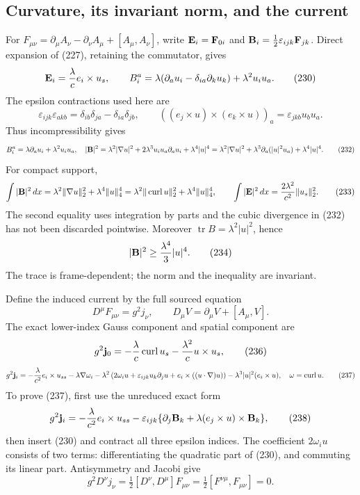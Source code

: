 \subsection{Curvature, its invariant norm, and the current}

For \(F_{\mu\nu}=\partial_\mu A_\nu-\partial_\nu A_\mu+[A_\mu,A_\nu]\),
write \({\bf E}_i={\bf F}_{0i}\) and
\({\bf B}_i=\frac12\varepsilon_{ijk}{\bf F}_{jk}\). Direct expansion of
(227), retaining the commutator, gives
\[
 {\bf E}_i=\frac{\lambda}{c}e_i\times u_s,\qquad
 B_i^a=\lambda(\partial_a u_i-\delta_{ia}\partial_k u_k)
               +\lambda^2u_i u_a.
\tag{230}
\]
The epsilon contractions used here are
\[
 \varepsilon_{ijk}\varepsilon_{akb}
 =\delta_{ib}\delta_{ja}-\delta_{ia}\delta_{jb},\qquad
 ((e_j\times u)\times(e_k\times u))_a
 =\varepsilon_{jkb}u_bu_a.
\tag{231}
\]
Thus incompressibility gives
\[
 B_i^a=\lambda\partial_a u_i+\lambda^2u_i u_a,\quad
 |{\bf B}|^2=\lambda^2|\nabla u|^2+
 2\lambda^3u_i u_a\partial_a u_i+\lambda^4|u|^4
 =\lambda^2|\nabla u|^2+\lambda^3\partial_a(|u|^2u_a)
 +\lambda^4|u|^4.
\tag{232}
\]
For compact support,
\[
 \int|{\bf B}|^2\,dx
 =\lambda^2\|\nabla u\|_2^2+\lambda^4\|u\|_4^4
 =\lambda^2\|\operatorname{curl}u\|_2^2+\lambda^4\|u\|_4^4,\qquad
 \int|{\bf E}|^2\,dx=\frac{2\lambda^2}{c^2}\|u_s\|_2^2.
\tag{233}
\]
The second equality uses integration by parts and the cubic divergence in
(232) has not been discarded pointwise. Moreover
\(\operatorname{tr}B=\lambda^2|u|^2\), hence
\[
 |{\bf B}|^2\ge\frac{\lambda^4}{3}|u|^4.
\tag{234}
\]
The trace is frame-dependent; the norm and the inequality are invariant.

Define the induced current by the full sourced equation
\[
 D^\mu F_{\mu\nu}=g^2j_\nu,\qquad D_\mu V=\partial_\mu V+[A_\mu,V].
\tag{235}
\]
The exact lower-index Gauss component and spatial component are
\[
 g^2{\bf j}_0=-\frac{\lambda}{c}\operatorname{curl}u_s
              -\frac{\lambda^2}{c}u\times u_s,
\tag{236}
\]
\[
 g^2{\bf j}_i=-\frac{\lambda}{c^2}e_i\times u_{ss}
 -\lambda\nabla\omega_i
 -\lambda^2\left(2\omega_i u+
 \varepsilon_{ijk}u_k\partial_j u+e_i\times((u\cdot\nabla)u)\right)
 -\lambda^3|u|^2(e_i\times u),\quad \omega=\operatorname{curl}u.
\tag{237}
\]
To prove (237), first use the unreduced exact form
\[
 g^2{\bf j}_i=-\frac{\lambda}{c^2}e_i\times u_{ss}
 -\varepsilon_{ijk}\{\partial_j{\bf B}_k+
 \lambda(e_j\times u)\times{\bf B}_k\},
\tag{238}
\]
then insert (230) and contract all three epsilon indices. The coefficient
\(2\omega_i u\) consists of two terms: differentiating the quadratic
part of (230), and commuting its linear part. Antisymmetry and Jacobi give
\[
 g^2D^\nu j_\nu
 =\tfrac12[D^\nu,D^\mu]F_{\mu\nu}
 =\tfrac12[F^{\nu\mu},F_{\mu\nu}]=0.
\tag{239}
\]

